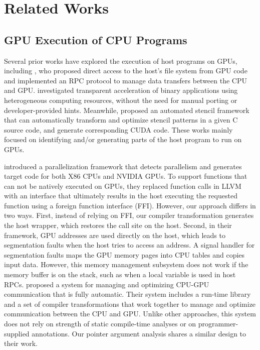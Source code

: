 \section{Related Works}
\label{sec:related-works}

\subsection{GPU Execution of CPU Programs}
Several prior works have explored the execution of host programs on GPUs, including \citet{DBLP:conf/asplos/SilbersteinFKW13}, who proposed direct access to the host's file system from GPU code and implemented an RPC protocol to manage data transfers between the CPU and GPU.
\citet{DBLP:conf/date/DamschenRVP15} investigated transparent acceleration of binary applications using heterogeneous computing resources, without the need for manual porting or developer-provided hints.
Meanwhile, \citet{dblp:conf/cgo/MatsumuraZWEM20} proposed an automated stencil framework that can automatically transform and optimize stencil patterns in a given C source code, and generate corresponding CUDA code.
These works mainly focused on identifying and/or generating parts of the host program to run on GPUs.

\citet{DBLP:conf/ipps/MikushinLZB14} introduced a parallelization framework that detects parallelism and generates target code for both X86 CPUs and NVIDIA GPUs.
To support functions that can not be natively executed on GPUs, they replaced function calls in LLVM with an interface that ultimately results in the host executing the requested function using a foreign function interface (FFI).
However, our approach differs in two ways.
First, instead of relying on FFI, our compiler transformation generates the host wrapper, which restores the call site on the host.
Second, in their framework, GPU addresses are used directly on the host, which leads to segmentation faults when the host tries to access an address.
A signal handler for segmentation faults maps the GPU memory pages into CPU tables and copies input data.
However, this memory management subsystem does not work if the memory buffer is on the stack, such as when a local variable is used in host RPCs.
\citet{DBLP:conf/pldi/JablinPJJBA11} proposed a system for managing and optimizing CPU-GPU communication that is fully automatic.
Their system includes a run-time library and a set of compiler transformations that work together to manage and optimize communication between the CPU and GPU.
Unlike other approaches, this system does not rely on strength of static compile-time analyses or on programmer-supplied annotations.
Our pointer argument analysis shares a similar design to their work.

